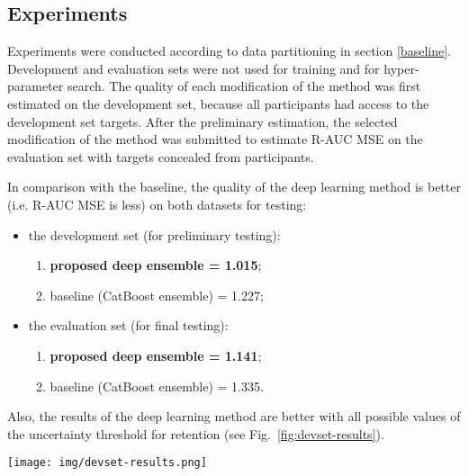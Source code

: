 \documentclass{article}
\begin{document}
\subsection{Experiments}

Experiments were conducted according to data partitioning in section \ref{baseline}. Development and evaluation sets were not used for training and for hyper-parameter search. The quality of each modification of the method was first estimated on the development set, because all participants had access to the development set targets. After the preliminary estimation, the selected modification of the method was submitted to estimate R-AUC MSE on the evaluation set with targets concealed from participants.

In comparison with the baseline, the quality of the deep learning method is better (i.e. R-AUC MSE is less) on both datasets for testing:

\begin{itemize}
    \item the development set (for preliminary testing):
        \begin{enumerate}
            \item \textbf{proposed deep ensemble = 1.015};
            \item baseline (CatBoost ensemble) = 1.227;
        \end{enumerate}
    \item the evaluation set (for final testing):
        \begin{enumerate}
            \item \textbf{proposed deep ensemble = 1.141};
            \item baseline (CatBoost ensemble) = 1.335.
        \end{enumerate}
\end{itemize}

Also, the results of the deep learning method are better with all possible values of the uncertainty threshold for retention (see Fig.~\ref{fig:devset-results}).

\begin{figure*}[hbt!]
 \centering
\begin{minipage}[h]{0.8\linewidth}
  \centering
  \centerline{\texttt{[image: img/devset-results.png]}}
  \vspace{-0.1cm}
\end{minipage}
 \caption{Error retention curves on the development set.}
 \label{fig:devset-results}
\end{figure*}
\end{document}
